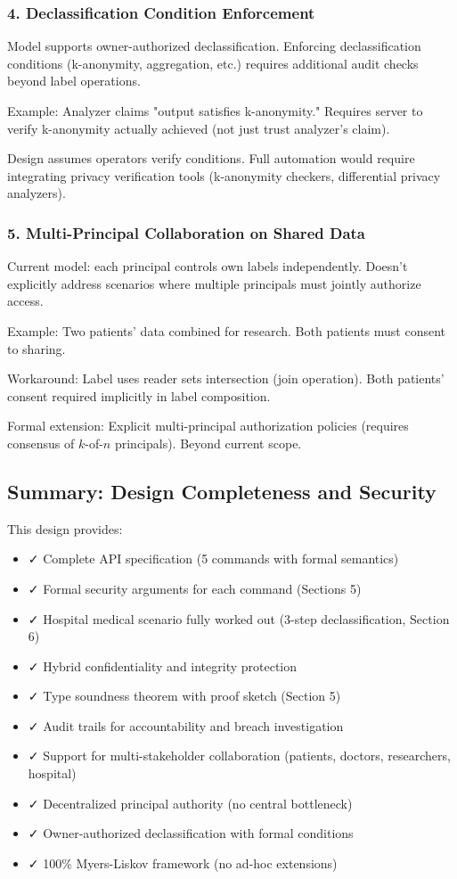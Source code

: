\subsubsection{4. Declassification Condition Enforcement}

Model supports owner-authorized declassification. Enforcing declassification conditions (k-anonymity, aggregation, etc.) requires additional audit checks beyond label operations.

Example: Analyzer claims "output satisfies k-anonymity." Requires server to verify k-anonymity actually achieved (not just trust analyzer's claim).

Design assumes operators verify conditions. Full automation would require integrating privacy verification tools (k-anonymity checkers, differential privacy analyzers).

\subsubsection{5. Multi-Principal Collaboration on Shared Data}

Current model: each principal controls own labels independently. Doesn't explicitly address scenarios where multiple principals must jointly authorize access.

Example: Two patients' data combined for research. Both patients must consent to sharing.

Workaround: Label uses reader sets intersection (join operation). Both patients' consent required implicitly in label composition.

Formal extension: Explicit multi-principal authorization policies (requires consensus of $k$-of-$n$ principals). Beyond current scope.

\subsection{Summary: Design Completeness and Security}

This design provides:

\begin{itemize}
\item ✓ Complete API specification (5 commands with formal semantics)
\item ✓ Formal security arguments for each command (Sections 5)
\item ✓ Hospital medical scenario fully worked out (3-step declassification, Section 6)
\item ✓ Hybrid confidentiality and integrity protection
\item ✓ Type soundness theorem with proof sketch (Section 5)
\item ✓ Audit trails for accountability and breach investigation
\item ✓ Support for multi-stakeholder collaboration (patients, doctors, researchers, hospital)
\item ✓ Decentralized principal authority (no central bottleneck)
\item ✓ Owner-authorized declassification with formal conditions
\item ✓ 100\% Myers-Liskov framework (no ad-hoc extensions)
\end{itemize}

